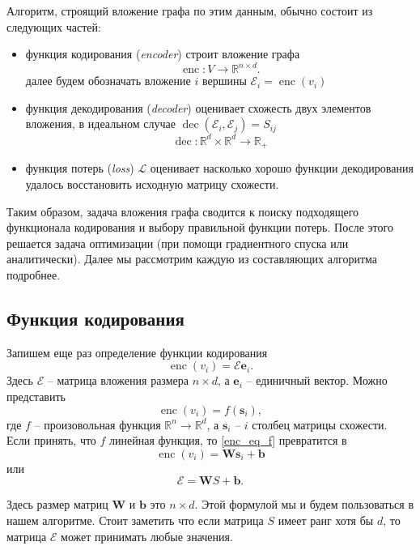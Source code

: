 \documentclass[12pt,a4paper]{extarticle}
\newcommand{\R}{\mathbb{R}}
\newcommand{\E}{\mathcal{E}}
\newcommand{\W}{\textbf{W}}
\newcommand{\s}{\textbf{s}}
\newcommand{\Loss}{\mathcal{L}}
\newcommand{\encoder}{\operatorname{enc}}
\newcommand{\decoder}{\operatorname{dec}}
\newcommand{\unit}[1]{\textbf{e}_{#1}}
\begin{document}
    Алгоритм, строящий вложение графа по этим данным, обычно состоит из следующих частей:
    \begin{itemize}
        \item функция кодирования (\textit{encoder}) строит вложение графа
            \[\encoder: V \to \R^{n \times d}.\]
            далее будем обозначать вложение $i$ вершины $\E_i = \encoder(v_i)$
        \item функция декодирования (\textit{decoder}) оценивает схожесть двух элементов вложения,
            в идеальном случае $\decoder(\E_i, \E_j) = S_{ij}$
            \[\decoder: \R^{d} \times \R^{d} \to \R_+\]
        \item функция потерь (\textit{loss}) $\Loss$ оценивает насколько хорошо функции декодирования удалось восстановить исходную матрицу схожести.
    \end{itemize}
    
    Таким образом, задача вложения графа сводится к поиску подходящего функционала кодирования и выбору правильной функции потерь. После этого решается задача оптимизации (при помощи градиентного спуска или аналитически). Далее мы рассмотрим каждую из составляющих алгоритма подробнее.

    \subsection{Функция кодирования}
    Запишем еще раз определение функции кодирования
    \begin{equation}
        \encoder(v_i) = \E\unit{i}.
    \end{equation}
    Здесь $\E$ -- матрица вложения размера $n \times d$, а $\unit{i}$ -- единичный вектор. Можно представить
    \begin{equation} \label{enc_eq_f}
        \encoder(v_i) = f(\s_i),
    \end{equation}
    где $f$ -- произовольная функция $\R^n \to \R^d$, а $\s_i$ -- $i$ столбец матрицы схожести.
    Если принять, что $f$ линейная функция, то \eqref{enc_eq_f} превратится в
    \begin{equation}
        \encoder(v_i) = \W\s_i + \textbf{b}
    \end{equation}
    или
    \begin{equation}
        \E = \W S + \textbf{b}.
    \end{equation}
    
    Здесь размер матриц $\W$ и $\textbf{b}$ это $n \times d$. Этой формулой мы и будем пользоваться в нашем алгоритме.
    Стоит заметить что если матрица $S$ имеет ранг хотя бы $d$, то матрица $\E$ может принимать любые значения.
\end{document}
